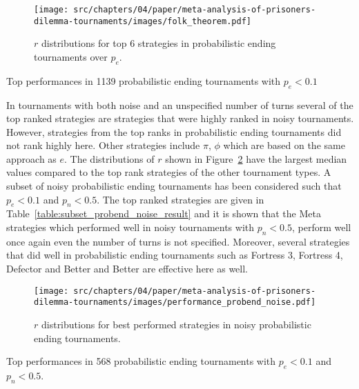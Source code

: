 \begin{figure}[!htbp]
    \centering
    \texttt{[image: src/chapters/04/paper/meta-analysis-of-prisoners-dilemma-tournaments/images/folk\_theorem.pdf]}
    \caption{\(r\) distributions for top 6 strategies in probabilistic ending tournaments
    over $p_e$.}
    \label{fig:effect_of_probend}
\end{figure}

\begin{table}[!htbp]
    \centering
    \resizebox{.30\textwidth}{!}{
    }
    \caption{Top performances in 1139 probabilistic ending tournaments with \(p_e < 0.1\)}
    \label{table:subset_probend_result}
\end{table}

In tournaments with both noise and an unspecified number of turns several of the
top ranked strategies are strategies that were highly ranked in noisy
tournaments. However, strategies from the top ranks in probabilistic ending
tournaments did not rank highly here. Other strategies include $\pi$, $\phi$
which are based on the same approach as $e$. The distributions of \(r\) shown in
Figure~\ref{fig:noisy_probend_results} have the largest median values compared
to the top rank strategies of the other tournament types. A subset of noisy
probabilistic ending tournaments has been considered such that \(p_e < 0.1\) and
\(p_n < 0.5\). The top ranked strategies are given in
Table~\ref{table:subset_probend_noise_result} and it is shown that the Meta
strategies which performed well in noisy tournaments with \(p_n < 0.5\), perform
well once again even the number of turns is not specified. Moreover, several
strategies that did well in probabilistic ending tournaments such as Fortress 3,
Fortress 4, Defector and Better and Better are effective here as well.

\begin{figure}[!htbp]
    \centering
    \texttt{[image: src/chapters/04/paper/meta-analysis-of-prisoners-dilemma-tournaments/images/performance\_probend\_noise.pdf]}
    \caption{\(r\) distributions for best performed strategies in noisy
    probabilistic ending tournaments.}
    \label{fig:noisy_probend_results}
\end{figure}

\begin{table}[!htbp]
    \centering
    \resizebox{.30\textwidth}{!}{
    }
    \caption{Top performances in 568 probabilistic ending tournaments with \(p_e < 0.1\) and \(p_n < 0.5\).}
    \label{table:subset_probend_noise_result}
\end{table}

